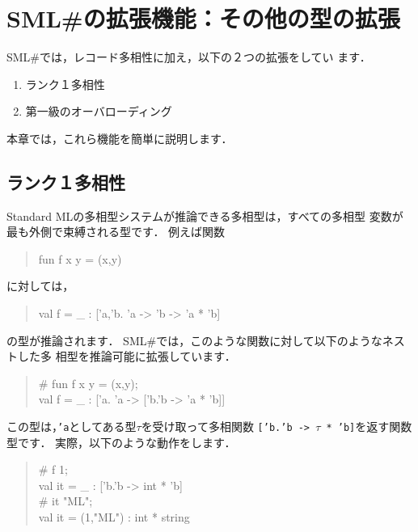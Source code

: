 \documentclass{jbook}
\newcommand{\smlsharp}{SML\#}
\newenvironment{program}{\begin{tt}\begin{quote}}{\end{quote}\end{tt}}
\begin{document}
\chapter{\smlsharp{}の拡張機能：その他の型の拡張}
\label{chap:tutorialOthertyping}

	\smlsharp{}では，レコード多相性に加え，以下の２つの拡張をしてい
ます．
\begin{enumerate}
\item ランク１多相性
\item 第一級のオーバローディング
\end{enumerate}
	本章では，これら機能を簡単に説明します．

\section{ランク１多相性}
\label{sec:extensionRank1}

	Standard MLの多相型システムが推論できる多相型は，すべての多相型
変数が最も外側で束縛される型です．
	例えば関数
\begin{program}
fun f x y = (x,y)
\end{program}
に対しては，
\begin{program}
val f = \_ : ['a,'b. 'a -> 'b -> 'a * 'b]
\end{program}
の型が推論されます．
	\smlsharp{}では，このような関数に対して以下のようなネストした多
相型を推論可能に拡張しています．
\begin{program}
\# fun f x y = (x,y);\\
val f = \_ : ['a. 'a -> ['b.'b -> 'a * 'b]]
\end{program}
	この型は，{\tt 'a}としてある型$\tau$を受け取って多相関数
{\tt ['b.'b -> $\tau$ * 'b]}を返す関数型です．
	実際，以下のような動作をします．
\begin{program}
\# f 1;\\
val it = \_ : ['b.'b -> int * 'b]\\
\# it "ML";\\
val it = (1,"ML") : int * string
\end{program}
\end{document}

